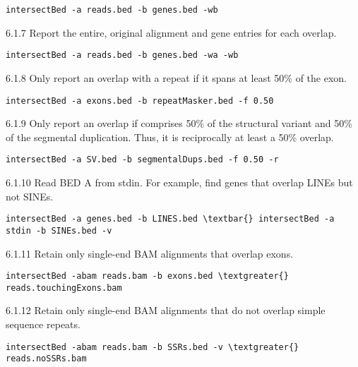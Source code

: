 \documentclass[letterpaper,10pt,english]{sphinxmanual}
\begin{document}
\begin{Verbatim}[commandchars=\\\{\}]
intersectBed -a reads.bed -b genes.bed -wb
\end{Verbatim}

6.1.7 Report the entire, original alignment and gene entries for each overlap.

\begin{Verbatim}[commandchars=\\\{\}]
intersectBed -a reads.bed -b genes.bed -wa -wb
\end{Verbatim}

6.1.8 Only report an overlap with a repeat if it spans at least 50\% of the exon.

\begin{Verbatim}[commandchars=\\\{\}]
intersectBed -a exons.bed -b repeatMasker.bed -f 0.50
\end{Verbatim}

6.1.9 Only report an overlap if comprises 50\% of the structural variant and 50\% of the segmental duplication. Thus, it is reciprocally at least a 50\% overlap.

\begin{Verbatim}[commandchars=\\\{\}]
intersectBed -a SV.bed -b segmentalDups.bed -f 0.50 -r
\end{Verbatim}

6.1.10 Read BED A from stdin. For example, find genes that overlap LINEs but not SINEs.

\begin{Verbatim}[commandchars=\\\{\}]
intersectBed -a genes.bed -b LINES.bed \textbar{} intersectBed -a stdin -b SINEs.bed -v
\end{Verbatim}

6.1.11 Retain only single-end BAM alignments that overlap exons.

\begin{Verbatim}[commandchars=\\\{\}]
intersectBed -abam reads.bam -b exons.bed \textgreater{} reads.touchingExons.bam
\end{Verbatim}

6.1.12 Retain only single-end BAM alignments that do not overlap simple sequence
repeats.

\begin{Verbatim}[commandchars=\\\{\}]
intersectBed -abam reads.bam -b SSRs.bed -v \textgreater{} reads.noSSRs.bam
\end{Verbatim}
\end{document}

